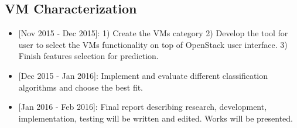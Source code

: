 \subsection{VM Characterization}

\begin{itemize}
\item{[Nov 2015 - Dec 2015]:} 1) Create the VMs category 2) Develop the tool for user to select the VMs functionality on top of OpenStack user interface. 3) Finish features selection for prediction.
\item{[Dec 2015 - Jan 2016]:} Implement and evaluate different classification algorithms and choose the best fit.
\item{[Jan 2016 - Feb 2016]:} Final report describing research, development, implementation, testing will be written and edited. Works will be presented.
\end{itemize}
